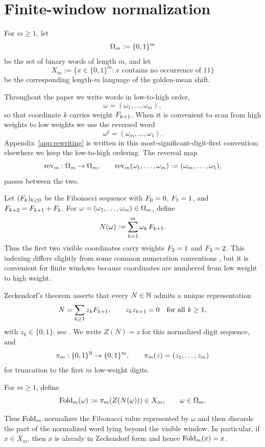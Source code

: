 \section{Finite-window normalization}
\label{sec:preliminaries}

For \(m\ge 1\), let
\[
\Omega_m:=\{0,1\}^m
\]
be the set of binary words of length \(m\), and let
\[
X_m:=\{x\in\{0,1\}^m:\text{$x$ contains no occurrence of \(11\)}\}
\]
be the corresponding length-\(m\) language of the golden-mean shift.

Throughout the paper we write words in low-to-high order,
\[
\omega=(\omega_1,\dots,\omega_m),
\]
so that coordinate \(k\) carries weight \(F_{k+1}\). When it is convenient to scan from high weights to low weights we use the reversed word
\[
\omega^\sharp=(\omega_m,\dots,\omega_1).
\]
Appendix~\ref{app:rewriting} is written in this most-significant-digit-first convention; elsewhere we keep the low-to-high ordering. The reversal map
\[
\mathrm{rev}_m:\Omega_m\to\Omega_m,\qquad
\mathrm{rev}_m(\omega_1,\dots,\omega_m):=(\omega_m,\dots,\omega_1),
\]
passes between the two.

Let \((F_k)_{k\ge 0}\) be the Fibonacci sequence with \(F_0=0\), \(F_1=1\), and \(F_{k+2}=F_{k+1}+F_k\). For \(\omega=(\omega_1,\dots,\omega_m)\in\Omega_m\), define
\begin{equation}\label{eq:Nomega}
N(\omega):=\sum_{k=1}^m \omega_k\,F_{k+1}.
\end{equation}
Thus the first two visible coordinates carry weights \(F_2=1\) and \(F_3=2\). This indexing differs slightly from some common numeration conventions \cite{Fraenkel1985,Frougny1988,Frougny1992,FrougnyConfluent1992,FrougnySolomyak1996,Berstel1985,AlloucheShallit2003}, but it is convenient for finite windows because coordinates are numbered from low weight to high weight.

Zeckendorf's theorem asserts that every \(N\in\mathbb{N}\) admits a unique representation
\begin{equation}\label{eq:zeck}
N=\sum_{k\ge 1} z_kF_{k+1},
\qquad
z_kz_{k+1}=0\quad\text{for all }k\ge 1,
\end{equation}
with \(z_k\in\{0,1\}\); see \cite{Lekkerkerker1952,Zeckendorf1972,Fraenkel1985}. We write \(Z(N)=z\) for this normalized digit sequence, and
\[
\pi_m:\{0,1\}^{\mathbb{N}}\to\{0,1\}^m,\qquad
\pi_m(z)=(z_1,\dots,z_m)
\]
for truncation to the first \(m\) low-weight digits.

\begin{definition}\label{def:fold}
For \(m\ge 1\), define
\begin{equation}\label{eq:fold}
\mathrm{Fold}_m(\omega):=\pi_m\!\left(Z\!\left(N(\omega)\right)\right)\in X_m,
\qquad \omega\in\Omega_m.
\end{equation}
\end{definition}

Thus \(\mathrm{Fold}_m\) normalizes the Fibonacci value represented by \(\omega\) and then discards the part of the normalized word lying beyond the visible window. In particular, if \(x\in X_m\), then \(x\) is already in Zeckendorf form and hence \(\mathrm{Fold}_m(x)=x\).
